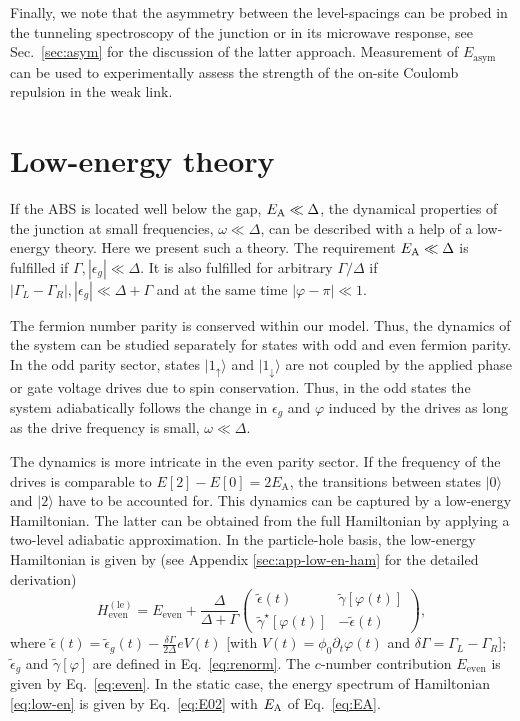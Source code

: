 \documentclass[aps,reprint,longbibliography, prb]{revtex4-2}
\begin{document}
Finally, we note that the asymmetry between the level-spacings can be probed in the tunneling spectroscopy of the junction \cite{pillet2010, chang2013} or in its microwave response, see Sec.~\ref{sec:asym} for the discussion of the latter approach. Measurement of $E_\mathrm{asym}$ can be used to experimentally assess the strength of the on-site Coulomb repulsion in the weak link.

\section{Low-energy theory}
\label{sec:low-energy}
If the ABS is located well below the gap, $E_{\rm A} \ll \Delta$, the dynamical properties of the junction at small frequencies, $\omega \ll \Delta$, can be described with a help of a low-energy theory. Here we present such a theory. The requirement $E_{\rm A}\ll \Delta$ is fulfilled if $\Gamma, |\epsilon_g| \ll \Delta$. It is also fulfilled for arbitrary $\Gamma/\Delta$ if $|\Gamma_L - \Gamma_R|, |\epsilon_g| \ll \Delta + \Gamma$ and at the same time $|\varphi - \pi| \ll 1$.

The fermion number parity is conserved within our model. Thus, the dynamics of the system can be studied separately for states with odd and even fermion parity. In the odd parity sector, states $|1_\uparrow\rangle$ and $|1_\downarrow\rangle$ are not coupled by the applied phase or gate voltage drives due to spin conservation. Thus, in the odd states the system adiabatically follows the change in $\epsilon_g$ and $\varphi$ induced by the drives as long as the drive frequency is small, $\omega\ll\Delta$.

The dynamics is more intricate in the even parity sector. If the frequency of the drives is comparable to $E[2]-E[0] = 2E_\mathrm{A}$, the transitions between states $|0\rangle$ and $|2\rangle$ have to be accounted for. This dynamics can be captured by a low-energy Hamiltonian. The latter can be obtained from the full Hamiltonian by applying a two-level adiabatic approximation.
In the particle-hole basis, the low-energy Hamiltonian is given by (see Appendix \ref{sec:app-low-en-ham} for the detailed derivation)
\begin{equation}
    \label{eq:low-en}
    H^{(\mathrm{le})}_\mathrm{even} = E_{\mathrm{even}}+ \frac{\Delta}{\Delta + \Gamma}  \begin{pmatrix}
    \tilde{\epsilon}(t)& \tilde{\gamma}[\varphi(t)]\\
    \tilde{\gamma}^\star[\varphi(t)] & -\tilde{\epsilon}(t)
    \end{pmatrix},
\end{equation}
where $\tilde{\epsilon}(t) =\tilde{\epsilon}_g(t) -\frac{\delta\Gamma}{2\Delta} e V(t)$
[with $V(t) = \phi_0 \partial_t \varphi(t)$ and $\delta\Gamma = \Gamma_L - \Gamma_R$]; $\tilde{\epsilon}_g$ and $\tilde{\gamma}[\varphi]$ are defined in Eq.~\eqref{eq:renorm}. The $c$-number contribution $E_{\mathrm{even}}$ is given by Eq.~\eqref{eq:even}. In the static case, the energy spectrum of Hamiltonian \eqref{eq:low-en} is given by Eq.~\eqref{eq:E02} with $E_{\rm A}$ of Eq.~\eqref{eq:EA}.
\end{document}
